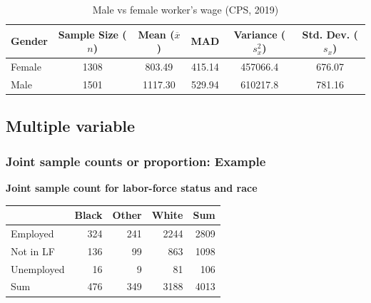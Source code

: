 \documentclass[
  letterpaper,
  DIV=11,
  numbers=noendperiod]{scrartcl}
\newenvironment{Shaded}{\begin{snugshade}}{\end{snugshade}}
\newcommand{\AttributeTok}[1]{\textcolor[rgb]{0.40,0.45,0.13}{#1}}
\newcommand{\FunctionTok}[1]{\textcolor[rgb]{0.28,0.35,0.67}{#1}}
\newcommand{\NormalTok}[1]{\textcolor[rgb]{0.00,0.23,0.31}{#1}}
\newcommand{\OtherTok}[1]{\textcolor[rgb]{0.00,0.23,0.31}{#1}}
\newcommand{\SpecialCharTok}[1]{\textcolor[rgb]{0.37,0.37,0.37}{#1}}
\newcommand{\StringTok}[1]{\textcolor[rgb]{0.13,0.47,0.30}{#1}}
\begin{document}
\begin{table}
\centering
\caption{\label{tab:cps desc 2}Male vs female worker's wage (CPS, 2019)}
\centering
\begin{tabular}[t]{lccccc}
\toprule
Gender & Sample Size ($n$) & Mean ($\overline{x}$) & MAD & Variance ($s_x^2$) & Std. Dev. ($s_x$)\\
\midrule
Female & 1308 & 803.49 & 415.14 & 457066.4 & 676.07\\
Male & 1501 & 1117.30 & 529.94 & 610217.8 & 781.16\\
\bottomrule
\end{tabular}
\end{table}

\subsection{Multiple variable}\label{multiple-variable}

\subsubsection{Joint sample counts or proportion:
Example}\label{joint-sample-counts-or-proportion-example}

\textbf{Joint sample count for labor-force status and race}

\begin{Shaded}
\end{Shaded}

\begin{table}
\centering
\begin{tabular}[t]{lrrrr}
\toprule
  & Black & Other & White & Sum\\
\midrule
Employed & 324 & 241 & 2244 & 2809\\
Not in LF & 136 & 99 & 863 & 1098\\
Unemployed & 16 & 9 & 81 & 106\\
Sum & 476 & 349 & 3188 & 4013\\
\bottomrule
\end{tabular}
\end{table}
\end{document}
